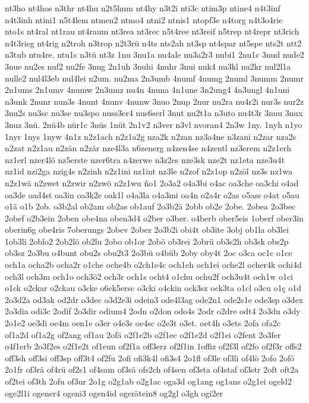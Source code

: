 {nt3ho
nt4hos
n3thr
nt4hu
n2t5hum
nt4hy
n3t2i
nti3c
ntim3p
ntine4
n4t3inf
n4t3inh
ntini1
n5t4lem
ntmen2
ntmo4
ntni2
ntnis1
ntopf3e
n4torg
n4t3o4rie
nto1s
nt4ral
nt1rau
nt4raum
nt3rea
nt3rec
n5t4ree
nt3reif
n5trep
nt4repr
nt3rich
n4t3rieg
nt4rig
n2troh
n3trop
n2t3rü
n4ts
nts2ah
nt3sp
nt4spar
nt5spe
nts2t
ntt2
n3tub
ntu4re.
ntu1s
n3tü
nt3z
1nu
3nu1a
nu4ale
nu3a2r3
nubi1
2nu1c
3nud
nude2
3nue
nu2es
nuf2
nu2fe
3nug
2n1uh
3nuhi
4nuhr
3nui
nuk4
nu3kl
nu2kr
nul2l1a
nulle2
nul4l3eb
nul4lei
n2um.
nu2ma
2n3umb
4numf
4numg
2numl
3numm
2numr
2n1ums
2n1umv
4numw
2n3umz
nu4n
4nuna
4n1une
3n2ung4
4n3ungl
4n1uni
n3unk
2nunr
nun3s
4nunt
4nunv
4nunw
3nuo
2nup
2nur
nu2ra
nu4r2i
nur3s
nur2z
3nu2s
nu3sc
nu3se
nu3spo
nuss3er4
nus6serl
3nut
nu2t1a
n3uto
nu4t3r
3nuu
3nux
3nuz
3nü.
2nü4b
nür1c
3nüs
1nüt
2n1v2
n3ver
n3vl
nvoran4
2n3w
1ny.
1nyh
n1yo
1nyr
1nys
1nyw
4n1z
n2z1ach
n2z1a2g
nza2k
n2zan
nz3a4ne
n3zani
n2zar
nza2s
n2zat
n2z1au
n2zän
n2zär
nze4l3a
n6zenerg
n4zen4se
n4zentl
nz3erem
n2z1erh
nz1erl
nzer4lö
nz5erste
nzer6tra
n4zerwe
n3z2es
nze3sk
nze2t
nz1eta
nze3u4t
nz1id
nzi2ga
nzig4s
n2zinh
n2z1ini
nz1int
nz3le
n2zof
n2z1op
n2zöl
nz3s
nz1wa
n2z1wä
n2zwet
n2zwir
n2zwö
n2z1wu
ño1
2o3a2
o4a3bi
o4ac
oa3che
oa3chi
o4ad
oa3de
oad4st
oa3in
oa3k2e
oak1l
o4a3la
o4a3mi
oa4n
o2a4r
o2as
o5ass
o4at
o5au
o1ä
o1b
2ob.
o3b2al
ob2am
ob2as
ob1auf
2o3b2ä
2obb
ob2e
2obe.
2obea
2o3bec
2obef
o2b3ein
2oben
obe4na
oben3d4
o2ber
o3ber.
o4berb
ober5eis
1oberf
ober3in
oberin6g
obe4ris
7oberungs
2obev
2obez
2o3b2i
obi4t
ob3ite
3obj
ob1la
ob3lei
1ob3li
2oblo2
2ob2lö
ob2lu
2obo
ob1or
2obö
ob3rei
2obrü
ob3s2h
ob3sk
obs2p
ob3sz
2o3bu
o4bunt
obu2s
obu2t3
2o3bü
o4büb
2oby
oby4t
2oc
o3ca
oc1c
o1ce
och1a
ocha2b
ocha2r
o1che
oche4b
o2ch1e4c
och1eh
och1ei
oche2l
ocher4k
ochi4d
och3l
och3m
och1o
och3ö2
och3r
och1s
ocht4
o1chu
ochu2f
och3u4t
och1w
o1ci
o1ck
o2ckar
o2ckau
o3cke
o6ck5ersc
o3cki
o4ckin
ock3sz
ock3ta
o1cl
o3cu
o1ç
o1d
2o3d2a
od3ak
od2dr
o3dec
o3d2e3i
odein3
ode4l3ag
ode2n1
ode2s1e
ode3sp
o3dex
2o3dia
odi3c
2odif
2o3dir
odium4
2odn
o2don
odo4s
2odr
o2dre
odt4
2o3du
o3dy
2o1e2
oe3di
oe4m
oen1e
o3er
o4e3s
oe4sc
o2e3t
o3et.
oet4h
o3ets
2ofa
ofa2c
of1a2d
of1a2g
of2ang
of1au
2ofä
o2f1e2b
o2f1ec
o2f1e2d
o2f1ei
o2fent
2o3fer
o4f1erb
2o3f2es
o2f1e2t
of1eun
of2f1a
off3erz
of2f1in
1offiz
of2f3l
of2fo
of2f3r
offs2
off3sh
off3si
off3sp
off3t4
of2fu
2ofi
ofi3k4l
ofi3s4
2o1fl
of3le
of3li
of4lö
2ofo
2ofö
2o1fr
of3rä
of4rü
of2s1
of4sam
of3sä
ofs2ch
of4sen
of3sta
of4staf
of3str
2oft
oft2a
of2tei
of3th
2ofu
of3ur
2o1g
o2g1ab
o2g1ac
oga3d
og1ang
og1ans
o2g1ei
ogeld2
oge2l1i
ogener4
ogeni3
ogen4id
ogerätein8
og2gl
o3gh
ogi2er
}
